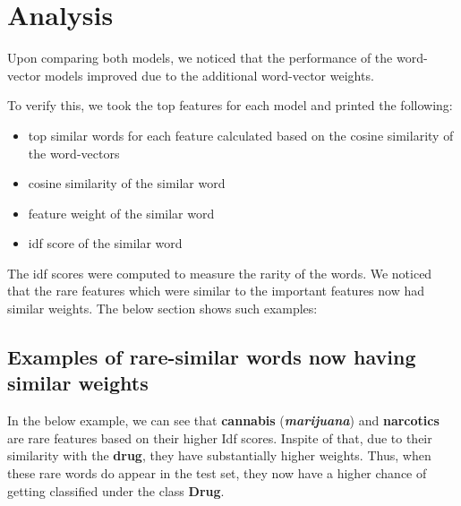 \newpage
\section{Analysis}
Upon comparing both models, we noticed that the performance of the word-vector models improved due to the additional word-vector weights.

To verify this, we took the top features for each model and printed the following:

\begin{itemize}
\item top similar words for each feature calculated based on the cosine similarity of the word-vectors

\item cosine similarity of the similar word

\item feature weight of the similar word

\item idf score of the similar word
\end{itemize}

The idf scores were computed to measure the rarity of the words. We noticed that the rare features which were similar to the important features now had similar weights. The below section shows such examples:

\subsection{Examples of rare-similar words now having similar weights}

In the below example, we can see that \textbf{cannabis} (\textbf{\textit{marijuana}}) and \textbf{narcotics} are rare features based on their higher Idf scores. Inspite of that, due to their similarity with the \textbf{drug}, they have substantially higher weights. Thus, when these rare words do appear in the test set, they now have a higher chance of getting classified under the class \textbf{Drug}.

